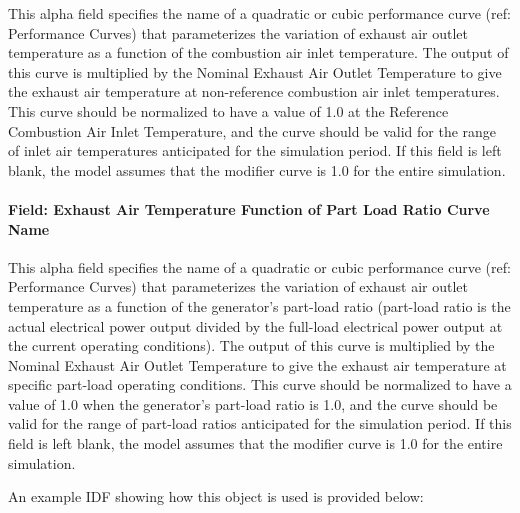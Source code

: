 This alpha field specifies the name of a quadratic or cubic performance curve (ref: Performance Curves) that parameterizes the variation of exhaust air outlet temperature as a function of the combustion air inlet temperature. The output of this curve is multiplied by the Nominal Exhaust Air Outlet Temperature to give the exhaust air temperature at non-reference combustion air inlet temperatures. This curve should be normalized to have a value of 1.0 at the Reference Combustion Air Inlet Temperature, and the curve should be valid for the range of inlet air temperatures anticipated for the simulation period. If this field is left blank, the model assumes that the modifier curve is 1.0 for the entire simulation.

\paragraph{Field: Exhaust Air Temperature Function of Part Load Ratio Curve Name}\label{field-exhaust-air-temperature-function-of-part-load-ratio-curve-name}

This alpha field specifies the name of a quadratic or cubic performance curve (ref: Performance Curves) that parameterizes the variation of exhaust air outlet temperature as a function of the generator's part-load ratio (part-load ratio is the actual electrical power output divided by the full-load electrical power output at the current operating conditions). The output of this curve is multiplied by the Nominal Exhaust Air Outlet Temperature to give the exhaust air temperature at specific part-load operating conditions. This curve should be normalized to have a value of 1.0 when the generator's part-load ratio is 1.0, and the curve should be valid for the range of part-load ratios anticipated for the simulation period. If this field is left blank, the model assumes that the modifier curve is 1.0 for the entire simulation.

An example IDF showing how this object is used is provided below:

